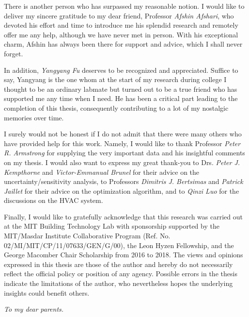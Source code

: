 There is another person who has surpassed my reasonable notion. I would like to deliver my sincere gratitude to my dear friend, Professor \textit{Afshin Afshari}, who devoted his effort and time to introduce me his splendid research and remotely offer me any help, although we have never met in person. With his exceptional charm, Afshin has always been there for support and advice, which I shall never forget.

In addition, \textit{Yangyang Fu} deserves to be recognized and appreciated. Suffice to say, Yangyang is the one whom at the start of my research during college I thought to be an ordinary labmate but turned out to be a true friend who has supported me any time when I need. He has been a critical part leading to the completion of this thesis, consequently contributing to a lot of my nostalgic memories over time.

I surely would not be honest if I do not admit that there were many others who have provided help for this work. Namely, I would like to thank Professor \textit{Peter R. Armstrong} for supplying the very important data and his insightful comments on my thesis. I would also want to express my great thank-you to Drs. \textit{Peter J. Kempthorne} and \textit{Victor-Emmanual Brunel} for their advice on the uncertainty/sensitivity analysis, to Professors \textit{Dimitris J. Bertsimas} and \textit{Patrick Jaillet} for their advice on the optimization algorithm, and to \textit{Qinzi Luo} for the discussions on the HVAC system.

Finally, I would like to gratefully acknowledge that this research was carried out at the MIT Building Technology Lab with sponsorship supported by the MIT/Masdar Institute Collaborative Program (Ref. No. 02/MI/MIT/CP/11/07633/GEN/G/00), the Leon Hyzen Fellowship, and the George Macomber Chair Scholarship from 2016 to 2018. The views and opinions expressed in this thesis are those of the author and hereby do not necessarily reflect the official policy or position of any agency. Possible errors in the thesis indicate the limitations of the author, who nevertheless hopes the underlying insights could benefit others.


\cleardoublepage

\vspace*{2.5in}
\hspace*{\fill}
\textit{To my dear parents.}
\vspace*{\fill}


